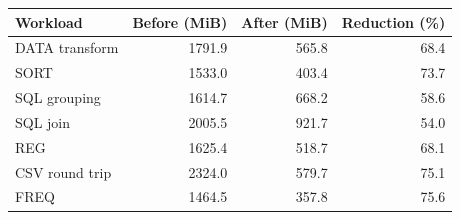 \begin{tabular}{lrrr}
\toprule
Workload & Before (MiB) & After (MiB) & Reduction (\%) \\
\midrule
DATA transform & 1791.9 & 565.8 & 68.4 \\
SORT & 1533.0 & 403.4 & 73.7 \\
SQL grouping & 1614.7 & 668.2 & 58.6 \\
SQL join & 2005.5 & 921.7 & 54.0 \\
REG & 1625.4 & 518.7 & 68.1 \\
CSV round trip & 2324.0 & 579.7 & 75.1 \\
FREQ & 1464.5 & 357.8 & 75.6 \\
\bottomrule
\end{tabular}
